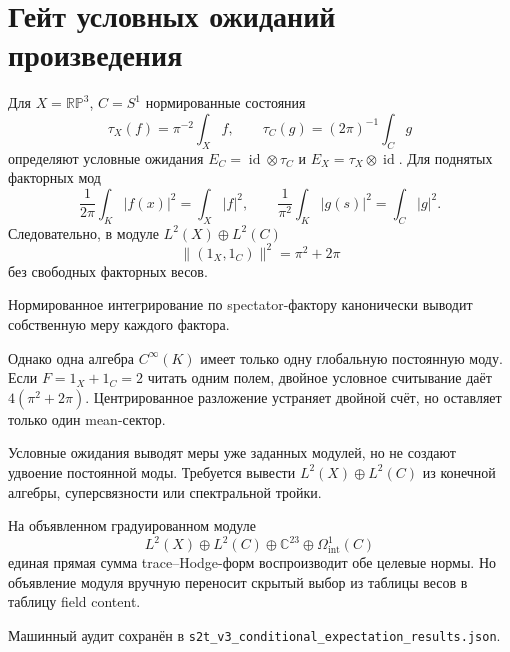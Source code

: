 \chapter{Гейт условных ожиданий произведения}

Для \(X=\mathbb{RP}^3\), \(C=S^1\) нормированные состояния
\begin{equation}
 \tau_X(f)=\pi^{-2}\int_X f,
 \qquad
 \tau_C(g)=(2\pi)^{-1}\int_C g
\end{equation}
определяют условные ожидания \(E_C=\operatorname{id}\otimes\tau_C\) и
\(E_X=\tau_X\otimes\operatorname{id}\). Для поднятых факторных мод
\begin{equation}
 \frac1{2\pi}\int_K|f(x)|^2=\int_X|f|^2,
 \qquad
 \frac1{\pi^2}\int_K|g(s)|^2=\int_C|g|^2.
\end{equation}
Следовательно, в модуле \(L^2(X)\oplus L^2(C)\)
\begin{equation}
 \|(1_X,1_C)\|^2=\pi^2+2\pi
\end{equation}
без свободных факторных весов.

\begin{proposition}
Нормированное интегрирование по spectator-фактору канонически выводит
собственную меру каждого фактора.
\end{proposition}

Однако одна алгебра \(C^\infty(K)\) имеет только одну глобальную
постоянную моду. Если \(F=1_X+1_C=2\) читать одним полем, двойное условное
считывание даёт \(4(\pi^2+2\pi)\). Центрированное разложение устраняет
двойной счёт, но оставляет только один mean-сектор.

\begin{lemma}
Условные ожидания выводят меры уже заданных модулей, но не создают
удвоение постоянной моды. Требуется вывести
\(L^2(X)\oplus L^2(C)\) из конечной алгебры, суперсвязности или
спектральной тройки.
\end{lemma}

На объявленном градуированном модуле
\begin{equation}
 L^2(X)\oplus L^2(C)\oplus\mathbb C^{23}
 \oplus\Omega^1_{\mathrm{int}}(C)
\end{equation}
единая прямая сумма trace--Hodge-форм воспроизводит обе целевые нормы.
Но объявление модуля вручную переносит скрытый выбор из таблицы весов в
таблицу field content.

Машинный аудит сохранён в
\texttt{s2t\_v3\_conditional\_expectation\_results.json}.